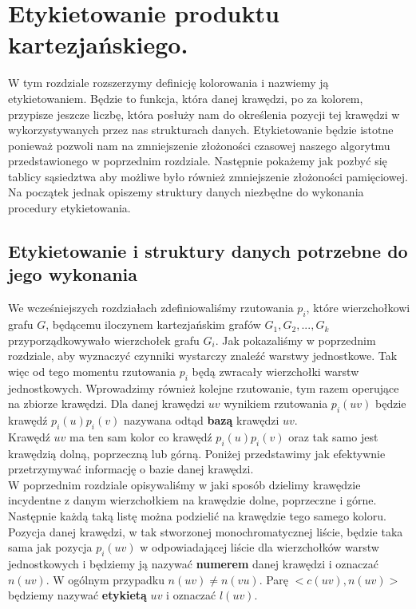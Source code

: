 \documentclass[12pt,a4paper,titlepage]{article}
\newcommand\tab[1][1cm]{\hspace*{#1}}
\begin{document}
\section{Etykietowanie produktu kartezjańskiego.}
W tym rozdziale rozszerzymy definicję kolorowania i nazwiemy ją etykietowaniem. Będzie to funkcja, która danej krawędzi, po za kolorem, przypisze jeszcze liczbę, która posłuży nam do określenia pozycji tej krawędzi w wykorzystywanych przez nas strukturach danych. Etykietowanie będzie istotne ponieważ pozwoli nam na zmniejszenie złożoności czasowej naszego algorytmu przedstawionego w poprzednim rozdziale. Następnie pokażemy jak pozbyć się tablicy sąsiedztwa aby możliwe było również zmniejszenie złożoności pamięciowej. Na początek jednak opiszemy struktury danych niezbędne do wykonania procedury etykietowania.
\subsection{Etykietowanie i struktury danych potrzebne do jego wykonania}
\tab[0.6cm]We wcześniejszych rozdziałach zdefiniowaliśmy rzutowania $p_i$, które wierzchołkowi grafu $G$, będącemu iloczynem kartezjańskim grafów $G_1, G_2, ..., G_k$ przyporządkowywało wierzchołek grafu $G_i$. Jak pokazaliśmy w poprzednim rozdziale, aby wyznaczyć czynniki wystarczy znaleźć warstwy jednostkowe. Tak więc od tego momentu rzutowania $p_i$ będą zwracały wierzchołki warstw jednostkowych. Wprowadzimy również kolejne rzutowanie, tym razem operujące na zbiorze krawędzi. Dla danej krawędzi $uv$ wynikiem rzutowania $p_i(uv)$ będzie krawędź $p_i(u)p_i(v)$ nazywana odtąd \textbf{bazą} krawędzi $uv$. \\
\tab[0.6cm]Krawędź $uv$ ma ten sam kolor co krawędź $p_i (u)p_i(v)$ oraz tak samo jest krawędzią dolną, poprzeczną lub górną. Poniżej przedstawimy jak efektywnie przetrzymywać informację o bazie danej krawędzi.\\
\tab[0.6cm]W poprzednim rozdziale opisywaliśmy w jaki sposób dzielimy krawędzie incydentne z danym wierzchołkiem na krawędzie dolne, poprzeczne i górne. Następnie każdą taką listę można podzielić na krawędzie tego samego koloru. Pozycja danej krawędzi, w tak stworzonej monochromatycznej liście, będzie taka sama jak pozycja $p_i(uv)$ w odpowiadającej liście dla wierzchołków warstw jednostkowych i będziemy ją nazywać \textbf{numerem} danej krawędzi i oznaczać $n(uv)$. W ogólnym przypadku $n(uv) \neq n(vu)$. Parę $<c(uv), n(uv)>$ będziemy nazywać \textbf{etykietą} $uv$ i oznaczać $l(uv)$. \\
\end{document}
